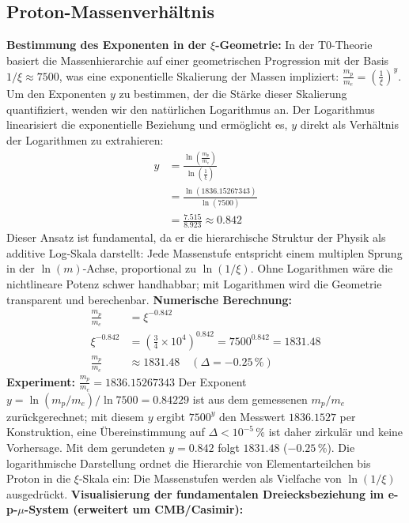 	\subsection{Proton-Massenverhältnis}
	\textbf{Bestimmung des Exponenten in der $\xi$-Geometrie:}
	In der T0-Theorie basiert die Massenhierarchie auf einer geometrischen Progression mit der Basis $1/\xi \approx 7500$, was eine exponentielle Skalierung der Massen impliziert: $\frac{m_p}{m_e} = \left(\frac{1}{\xi}\right)^y$. Um den Exponenten $y$ zu bestimmen, der die Stärke dieser Skalierung quantifiziert, wenden wir den natürlichen Logarithmus an. Der Logarithmus linearisiert die exponentielle Beziehung und ermöglicht es, $y$ direkt als Verhältnis der Logarithmen zu extrahieren:
	\begin{align}
		y &= \frac{\ln \left( \frac{m_p}{m_e} \right)}{\ln \left( \frac{1}{\xi} \right)} \\
		&= \frac{\ln (1836.15267343)}{\ln (7500)} \\
		&= \frac{7.515}{8.923} \approx 0.842
	\end{align}
	Dieser Ansatz ist fundamental, da er die hierarchische Struktur der Physik als additive Log-Skala darstellt: Jede Massenstufe entspricht einem multiplen Sprung in der $\ln(m)$-Achse, proportional zu $\ln(1/\xi)$. Ohne Logarithmen wäre die nichtlineare Potenz schwer handhabbar; mit Logarithmen wird die Geometrie transparent und berechenbar.
	\textbf{Numerische Berechnung:}
	\begin{align}
		\frac{m_p}{m_e} &= \xi^{-0.842} \\
		\xi^{-0.842} &= \left( \frac{3}{4} \times 10^{4} \right)^{0.842} = 7500^{0.842} = 1831.48 \\
		\frac{m_p}{m_e} &\approx 1831.48 \quad (\Delta = -0.25\,\%)
	\end{align}
	\textbf{Experiment:} $\frac{m_p}{m_e} = 1836.15267343$
	Der Exponent $y = \ln(m_p/m_e)/\ln 7500 = 0.84229$ ist aus dem gemessenen $m_p/m_e$ zurückgerechnet; mit diesem $y$ ergibt $7500^{y}$ den Messwert $1836.1527$ per Konstruktion, eine Übereinstimmung auf $\Delta < 10^{-5}\,\%$ ist daher zirkulär und keine Vorhersage. Mit dem gerundeten $y = 0.842$ folgt $1831.48$ ($-0.25\,\%$). Die logarithmische Darstellung ordnet die Hierarchie von Elementarteilchen bis Proton in die $\xi$-Skala ein: Die Massenstufen werden als Vielfache von $\ln(1/\xi)$ ausgedrückt.
	\textbf{Visualisierung der fundamentalen Dreiecksbeziehung im e-p-$\mu$-System (erweitert um CMB/Casimir):}
